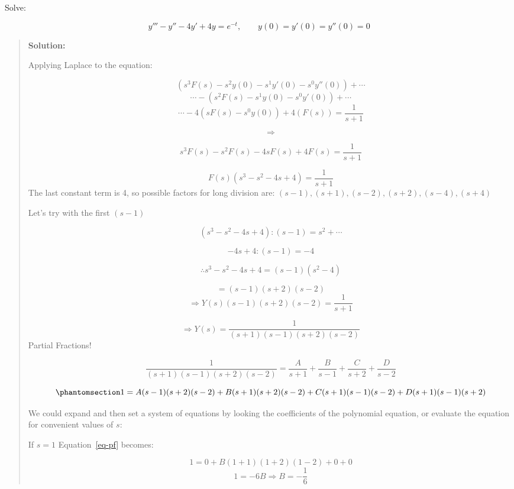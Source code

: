 \documentclass[
  letterpaper,
  DIV=11,
  numbers=noendperiod]{scrreprt}
\theoremstyle{plain}
\theoremstyle{remark}
\begin{document}
\begin{tcolorbox}[enhanced jigsaw, title=\textcolor{quarto-callout-tip-color}{\faLightbulb}\hspace{0.5em}{Example}, colbacktitle=quarto-callout-tip-color!10!white, opacitybacktitle=0.6, opacityback=0, rightrule=.15mm, breakable, titlerule=0mm, colback=white, bottomtitle=1mm, colframe=quarto-callout-tip-color-frame, toprule=.15mm, leftrule=.75mm, toptitle=1mm, arc=.35mm, bottomrule=.15mm, left=2mm, coltitle=black]

Solve:

\[y''' -y''-4y'+4y=e^{-t},\qquad y(0)=y'(0)=y''(0)=0\]

\begin{quote}
\textbf{Solution:}

Applying Laplace to the equation:

\[(s^3F(s)-s^2y(0)-s^1y'(0)-s^0y''(0))+\cdots\]
\[\cdots-(s^2F(s)-s^1y(0)-s^0y'(0))+\cdots\]
\[\cdots-4(sF(s)-s^0y(0))+4(F(s))=\frac{1}{s+1}\]

\[\Rightarrow\]

\[s^3F(s)-s^2F(s)-4sF(s)+4F(s)=\frac{1}{s+1}\]

\[F(s)(s^3-s^2-4s+4)=\frac{1}{s+1}\] The last constant term is 4, so
possible factors for long division are:
\((s-1),(s+1),(s-2),(s+2),(s-4),(s+4)\)

Let's try with the first \((s-1)\)

\[(s^3-s^2-4s+4):(s-1)=s^2+\cdots\]

\[-4s+4:(s-1)=-4\]

\[\therefore s^3-s^2-4s+4=(s-1)(s^2-4)\]

\[=(s-1)(s+2)(s-2)\] \[\Rightarrow Y(s)(s-1)(s+2)(s-2)=\frac{1}{s+1}\]

\[\Rightarrow Y(s)=\frac{1}{(s+1)(s-1)(s+2)(s-2)}\] Partial Fractions!

\[\frac{1}{(s+1)(s-1)(s+2)(s-2)}=\frac{A}{s+1}+\frac{B}{s-1}+\frac{C}{s+2}+\frac{D}{s-2}\]

\begin{equation}\phantomsection\label{eq-pf}{1=A(s-1)(s+2)(s-2)+B(s+1)(s+2)(s-2)+C(s+1)(s-1)(s-2)+D(s+1)(s-1)(s+2)}\end{equation}

We could expand and then set a system of equations by looking the
coefficients of the polynomial equation, or evaluate the equation for
convenient values of \(s\):

If \(s=1\) Equation~\ref{eq-pf} becomes:

\[1=0+B(1+1)(1+2)(1-2)+0+0\] \[1=-6B\Rightarrow \boxed{B=-\frac{1}{6}}\]


\end{quote}
\end{tcolorbox}
\end{document}
